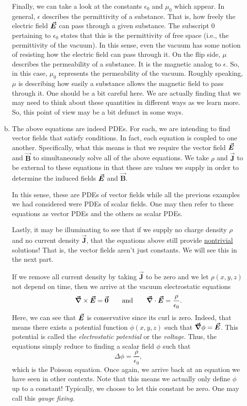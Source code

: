 \documentclass[12pt]{article} %
\newcommand{\vecfieldB}{\boldsymbol{\vec{B}}}
\newcommand{\vecfieldJ}{\boldsymbol{\vec{J}}}
\begin{document}
\begin{solution}
\begin{enumerate}[(a)]
    Finally, we can take a look at the constants $\epsilon_0$ and $\mu_0$ which appear.  In general, $\epsilon$ describes the permittivity of a substance.  That is, how freely the electric field $\boldsymbol{\vec{E}}$ can pass through a given substance.  The subscript $0$ pertaining to $\epsilon_0$ states that this is the permittivity of free space (i.e., the permittivity of the vacuum).  In this sense, even the vacuum has some notion of resisting how the electric field can pass through it. On the flip side, $\mu$ describes the permeability of a substance.  It is the magnetic analog to $\epsilon$. So, in this case, $\mu_0$ represents the permeability of the vacuum.  Roughly speaking, $\mu$ is describing how easily a substance allows the magnetic field to pass through it. One should be a bit careful here.  We are actually finding that we may need to think about these quantities in different ways as we learn more.  So, this point of view may be a bit defunct in some ways.
    
    \item The above equations are indeed PDEs.  For each, we are intending to find vector fields that satisfy conditions.  In fact, each equation is coupled to one another.  Specifically, what this means is that we require the vector field $\boldsymbol{\vec{E}}$ and $\vecfieldB$ to simultaneously solve all of the above equations. We take $\rho$ and $\vecfieldJ$ to be external to these equations in that these are values we supply in order to determine the induced fields $\boldsymbol{\vec{E}}$ and $\vecfieldB$.  
    
    In this sense, these are PDEs of vector fields while all the previous examples we had considered were PDEs of scalar fields.  One may then refer to these equations as vector PDEs and the others as scalar PDEs.  
    
    Lastly, it may be illuminating to see that if we supply no charge density $\rho$ and no current density $\vecfieldJ$, that the equations above still provide \underline{nontrivial} solutions! That is, the vector fields aren't just constants.  We will see this in the next part.
    
    If we remove all current density by taking $\vecfieldJ$ to be zero and we let $\rho(x,y,z)$ not depend on time, then we arrive at the vacuum electrostatic equations
    \begin{align*}
        \boldsymbol{\vec{\nabla}} \times \boldsymbol{\vec{E}} = \boldsymbol{\vec{0}} \qquad \textrm{and} \qquad \boldsymbol{\vec{\nabla}} \cdot \boldsymbol{\vec{E}} = \frac{\rho}{\epsilon_0}.
    \end{align*}
    Here, we can see that $\boldsymbol{\vec{E}}$ is conservative since its curl is zero.  Indeed, that means there exists a potential function $\phi(x,y,z)$ such that $\boldsymbol{\vec{\nabla}} \phi = \boldsymbol{\vec{E}}$.  This potential is called the \emph{electrostatic potential} or the \emph{voltage}.  Thus, the equations simply reduce to finding a scalar field $\phi$ such that
    \[
    \Delta \phi = \frac{\rho}{\epsilon_0},
    \]
    which is the Poisson equation.  Once again, we arrive back at an equation we have seen in other contexts. Note that this means we actually only define $\phi$ up to a constant! Typically, we choose to let this constant be zero.  One may call this \emph{gauge fixing}.
    

\end{enumerate}
\end{solution}
\end{document}
